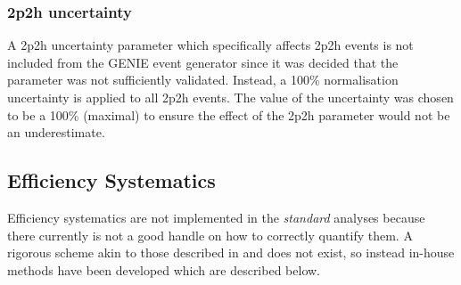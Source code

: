 \newpage
\subsubsection*{2p2h uncertainty}\label{sec:MEC_uncertainty}
A \gls{2p2h} uncertainty parameter which specifically affects \gls{2p2h} events is not included from the GENIE event generator since it was decided that the parameter was not sufficiently validated. Instead, a 100\% normalisation uncertainty is applied to all \gls{2p2h} events. The value of the uncertainty was chosen to be a 100\% (maximal) to ensure the effect of the \gls{2p2h} parameter would not be an underestimate. 



\clearpage

\subsection{Efficiency Systematics}\label{sec:efficiency_syst}

Efficiency systematics are not implemented in the \textit{standard} analyses because there currently is not a good handle on how to correctly quantify them. A rigorous scheme akin to those described in  and  does not exist, so instead in-house methods have been developed which are described below.

